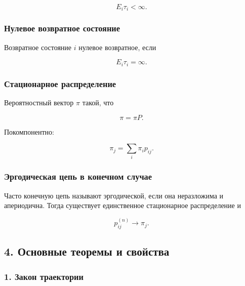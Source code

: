 \documentclass[
  11pt,
  a4paper,
]{article}
\begin{document}
\[
E_i\tau_i<\infty.
\]

\subsubsection{Нулевое возвратное
состояние}\label{ux43dux443ux43bux435ux432ux43eux435-ux432ux43eux437ux432ux440ux430ux442ux43dux43eux435-ux441ux43eux441ux442ux43eux44fux43dux438ux435}

Возвратное состояние \(i\) нулевое возвратное, если

\[
E_i\tau_i=\infty.
\]

\subsubsection{Стационарное
распределение}\label{ux441ux442ux430ux446ux438ux43eux43dux430ux440ux43dux43eux435-ux440ux430ux441ux43fux440ux435ux434ux435ux43bux435ux43dux438ux435}

Вероятностный вектор \(\pi\) такой, что

\[
\pi=\pi P.
\]

Покомпонентно:

\[
\pi_j=\sum_i\pi_i p_{ij}.
\]

\subsubsection{Эргодическая цепь в конечном
случае}\label{ux44dux440ux433ux43eux434ux438ux447ux435ux441ux43aux430ux44f-ux446ux435ux43fux44c-ux432-ux43aux43eux43dux435ux447ux43dux43eux43c-ux441ux43bux443ux447ux430ux435}

Часто конечную цепь называют эргодической, если она неразложима и
апериодична. Тогда существует единственное стационарное распределение и

\[
p_{ij}^{(n)}\to\pi_j.
\]

\subsection{4. Основные теоремы и
свойства}\label{ux43eux441ux43dux43eux432ux43dux44bux435-ux442ux435ux43eux440ux435ux43cux44b-ux438-ux441ux432ux43eux439ux441ux442ux432ux430}

\subsubsection{1. Закон
траектории}\label{ux437ux430ux43aux43eux43d-ux442ux440ux430ux435ux43aux442ux43eux440ux438ux438}
\end{document}
